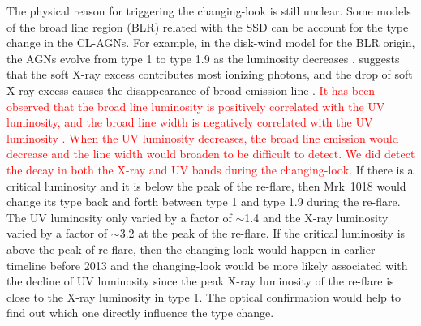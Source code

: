 The physical reason for triggering the changing-look is still unclear. Some models of the broad line region (BLR) \citep[see a recent review in ][and references therein]{2019OAst...28..200C} related with the SSD can be account for the type change in the CL-AGNs. For example, in the disk-wind model for the BLR origin, the AGNs evolve from type 1 to type 1.9 as the luminosity decreases \citep[see][]{2014MNRAS.438.3340E}. \citet{2018MNRAS.480.3898N} suggests that the soft X-ray excess contributes most ionizing photons, and the drop of soft X-ray excess causes the disappearance of broad emission line \citep[see also in ][]{2020MNRAS.492.2335L}. \textcolor{red}{ It has been observed that the broad line luminosity is positively correlated with the UV luminosity, and the broad line width is negatively correlated with the UV luminosity \citep[e.g.][]{2019ApJ...885...44D}. When the UV luminosity decreases, the broad line emission would decrease and the line width would broaden to be difficult to detect. We did detect the decay in both the X-ray and UV bands during the changing-look.} If there is a critical luminosity and it is below the peak of the re-flare, then Mrk~1018 would change its type back and forth between type 1 and type 1.9 during the re-flare. The UV luminosity only varied by a factor of $\sim$1.4 and the X-ray luminosity varied by a factor of $\sim$3.2 at the peak of the re-flare. If the critical luminosity is above the peak of re-flare, then the changing-look would happen in earlier timeline before 2013 and the changing-look would be more likely associated with the decline of UV luminosity since the peak X-ray luminosity of the re-flare is close to the X-ray luminosity in type 1. The optical confirmation would help to find out which one directly influence the type change.



